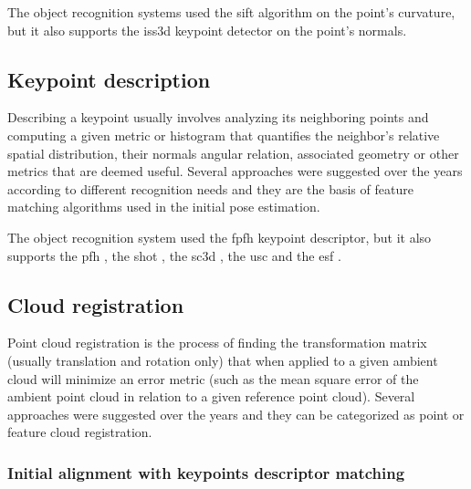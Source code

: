 The object recognition systems used the \gls{sift} \cite{Lowe2004} algorithm on the point's curvature, but it also supports the \gls{iss3d} \cite{Zhong2009} keypoint detector on the point's normals.


\subsection{Keypoint description}

Describing a keypoint usually involves analyzing its neighboring points and computing a given metric or histogram that quantifies the neighbor's relative spatial distribution, their normals angular relation, associated geometry or other metrics that are deemed useful. Several approaches were suggested over the years according to different recognition needs and they are the basis of feature matching algorithms used in the initial pose estimation.

The object recognition system used the \gls{fpfh} \cite{Rusu2009} keypoint descriptor, but it also supports the \gls{pfh} \cite{Rusu2008a}, the \gls{shot} \cite{Tombari2011}, the \gls{sc3d} \cite{Frome2004}, the \gls{usc} \cite{Tombari2010} and the \gls{esf} \cite{Wohlkinger2011}.


\subsection{Cloud registration}

Point cloud registration is the process of finding the transformation matrix (usually translation and rotation only) that when applied to a given ambient cloud will minimize an error metric (such as the mean square error of the ambient point cloud in relation to a given reference point cloud). Several approaches were suggested over the years and they can be categorized as point or feature cloud registration.


\subsubsection{Initial alignment with keypoints descriptor matching}\label{subsec:localization-system_feature-registration}

